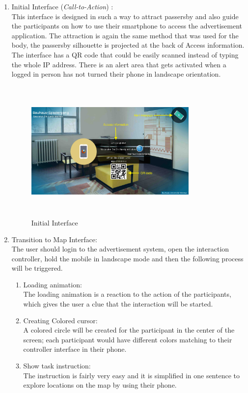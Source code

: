 \begin{enumerate}

\item Initial Interface (\emph{Call-to-Action}) : \\
This interface is designed in such a way to attract passersby and also guide the participants on how to use their smartphone to access the advertisement application. The attraction is again the same method that was used for the body, the passersby silhouette is projected at the back of Access information. The interface has a QR code that could be easily scanned instead of typing the whole IP address. There is an alert area that gets activated when a logged in person has not turned their phone in landscape orientation.
\begin{figure}[H]
    \centering
    \includegraphics[width=0.8\textwidth,height=70mm]{Figures/7/mobile_interactive/first_interface}
    \caption{Initial Interface}%
    \label{fig:mobile_firstinterface}%
\end{figure}



\item Transition to Map Interface: \\
The user should login to the advertisement system, open the interaction controller, hold the mobile in landscape mode and then the following process will be triggered. 

\begin{enumerate}
\item Loading animation:\\
The loading animation is a reaction to the action of the participants, which gives the user a clue that the interaction will be started. 
\item  Creating Colored cursor: \\
A colored circle will be created for the participant in the center of the screen; each participant would have different colors matching to their controller interface in their phone.
\item Show task instruction:  \\
The instruction is fairly very easy and it is simplified in one sentence to explore locations on the map by using their phone.


\end{enumerate}
\end{enumerate}
